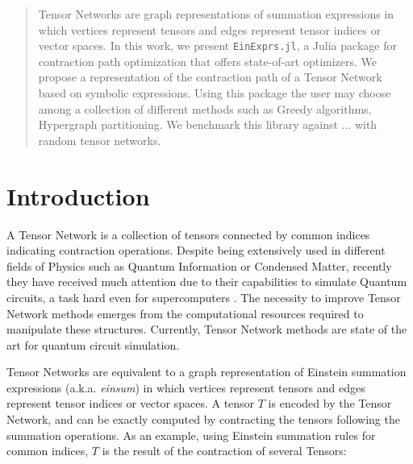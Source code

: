 \documentclass{juliacon}
\begin{document}


\maketitle

\begin{abstract}

Tensor Networks are graph representations of summation expressions in which vertices represent tensors and edges represent tensor indices or vector spaces.
In this work, we present \texttt{EinExprs.jl}, a Julia package for contraction path optimization that offers state-of-art optimizers.
We propose a representation of the contraction path of a Tensor Network based on symbolic expressions.
Using this package the user may choose among a collection of different methods such as Greedy algorithms, Hypergraph partitioning.
We benchmark this library against ... with random tensor networks.

\end{abstract}

\section{Introduction}
A Tensor Network is a collection of tensors connected by common indices indicating contraction operations. Despite being extensively used in different fields of Physics such as Quantum Information \cite{evenbly2022practical} or Condensed Matter\cite{SCHOLLWOCK201196}, recently they have received much attention due to their capabilities to simulate Quantum circuits, a task hard even for supercomputers \cite{PhysRevX.10.041038}. The necessity to improve Tensor Network methods emerges from the computational resources required to manipulate these structures. Currently, Tensor Network methods are state of the art for quantum circuit simulation.

Tensor Networks are equivalent to a graph representation of Einstein summation expressions (a.k.a. \textit{einsum}) in which vertices represent tensors and edges represent tensor indices or vector spaces. A tensor $T$ is encoded by the Tensor Network, and can be exactly computed by contracting the tensors following the summation operations. As an example, using Einstein summation rules for common indices, $T$ is the result of the contraction of several Tensors:
\end{document}
